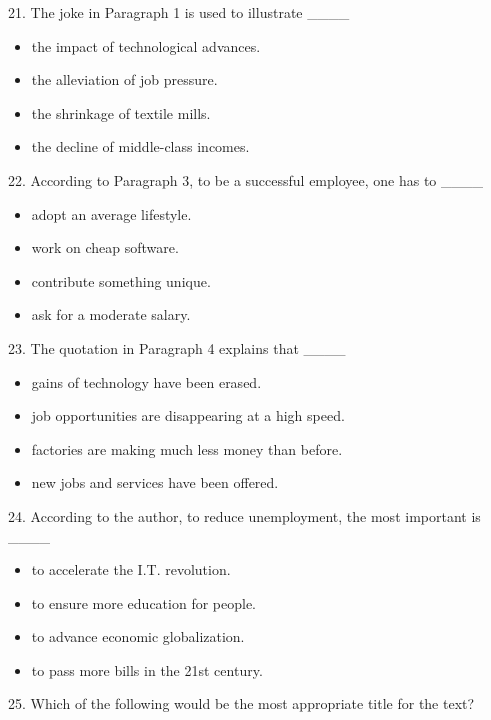 \documentclass[UTF8,11pt]{ctexart}
\begin{document}
21. The joke in Paragraph 1 is used to illustrate \_\_\_\_


\begin{itemize}[leftmargin=2em,itemsep=.2em,topsep=.4em]\item[A.] the impact of technological advances.
\item[B.] the alleviation of job pressure.
\item[C.] the shrinkage of textile mills.
\item[D.] the decline of middle-class incomes.
\end{itemize}

22. According to Paragraph 3, to be a successful employee, one has to \_\_\_\_


\begin{itemize}[leftmargin=2em,itemsep=.2em,topsep=.4em]\item[A.] adopt an average lifestyle.
\item[B.] work on cheap software.
\item[C.] contribute something unique.
\item[D.] ask for a moderate salary.
\end{itemize}

23. The quotation in Paragraph 4 explains that \_\_\_\_


\begin{itemize}[leftmargin=2em,itemsep=.2em,topsep=.4em]\item[A.] gains of technology have been erased.
\item[B.] job opportunities are disappearing at a high speed.
\item[C.] factories are making much less money than before.
\item[D.] new jobs and services have been offered.
\end{itemize}

24. According to the author, to reduce unemployment, the most important is \_\_\_\_


\begin{itemize}[leftmargin=2em,itemsep=.2em,topsep=.4em]\item[A.] to accelerate the I.T. revolution.
\item[B.] to ensure more education for people.
\item[C.] to advance economic globalization.
\item[D.] to pass more bills in the 21st century.
\end{itemize}

25. Which of the following would be the most appropriate title for the text?
\end{document}
